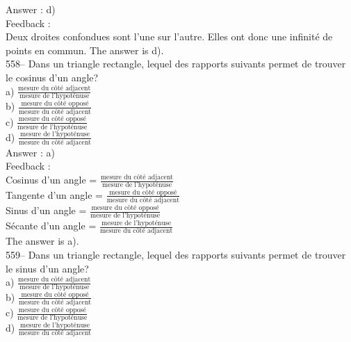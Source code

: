 ﻿\documentclass[letterpaper, 12pt]{article}
\begin{document}
Answer : d)\\

Feedback : \\
Deux droites confondues sont l'une sur l'autre.  Elles ont donc une
infinit\'e de points en commun.  The answer is d).\\

558-- Dans un triangle rectangle, lequel des rapports suivants permet de
trouver le cosinus d'un angle?\\[2mm]
a) $\frac{\textrm{mesure du c\^ot\'e adjacent}}{\textrm{mesure de
l'hypot\'enuse}}$\\[2mm]
b) $\frac{\textrm{mesure du c\^ot\'e oppos\'e}}{\textrm{mesure du c\^ot\'e
adjacent}}$\\[2mm]
c) $\frac{\textrm{mesure du c\^ot\'e oppos\'e}}{\textrm{mesure de
l'hypot\'enuse}}$\\[2mm]
d) $\frac{\textrm{mesure de l'hypot\'enuse}}{\textrm{mesure du c\^ot\'e
adjacent}}$\\

Answer : a)\\

Feedback : \\
Cosinus d'un angle = $\frac{\textrm{mesure du c\^ot\'e
adjacent}}{\textrm{mesure de l'hypot\'enuse}}$\\[2mm]
Tangente d'un angle = $\frac{\textrm{mesure du c\^ot\'e
oppos\'e}}{\textrm{mesure du c\^ot\'e adjacent}}$\\[2mm]
Sinus d'un angle = $\frac{\textrm{mesure du c\^ot\'e
oppos\'e}}{\textrm{mesure de l'hypot\'enuse}}$\\[2mm]
S\'ecante d'un angle =  $\frac{\textrm{mesure de
l'hypot\'enuse}}{\textrm{mesure du c\^ot\'e adjacent}}$\\[2mm]
The answer is a).\\

559-- Dans un triangle rectangle, lequel des rapports suivants permet de
trouver le sinus d'un angle?\\[2mm]
a) $\frac{\textrm{mesure du c\^ot\'e adjacent}}{\textrm{mesure de
l'hypot\'enuse}}$\\[2mm]
b) $\frac{\textrm{mesure du c\^ot\'e oppos\'e}}{\textrm{mesure du c\^ot\'e
adjacent}}$\\[2mm]
c) $\frac{\textrm{mesure du c\^ot\'e oppos\'e}}{\textrm{mesure de
l'hypot\'enuse}}$\\[2mm]
d) $\frac{\textrm{mesure de l'hypot\'enuse}}{\textrm{mesure du c\^ot\'e
adjacent}}$\\
\end{document}
